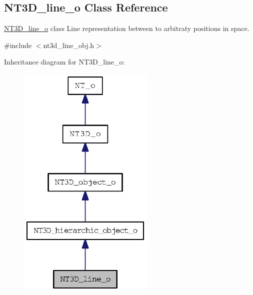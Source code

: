 \subsection{NT3D\_\-line\_\-o Class Reference}
\label{class_n_t3_d__line__o}


\hyperlink{class_n_t3_d__line__o}{NT3D\_\-line\_\-o} class Line representation between to arbitraty positions in space.  




{\ttfamily \#include $<$nt3d\_\-line\_\-obj.h$>$}



Inheritance diagram for NT3D\_\-line\_\-o:
\nopagebreak
\begin{figure}[H]
\begin{center}
\leavevmode
\includegraphics[width=184pt]{class_n_t3_d__line__o__inherit__graph}
\end{center}
\end{figure}


